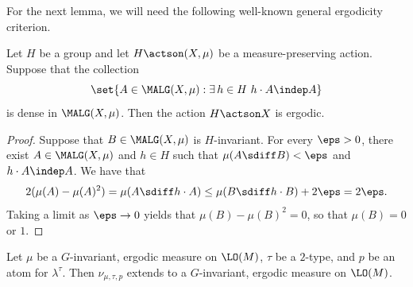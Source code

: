 For the next lemma, we will need the following well-known general ergodicity criterion.
\begin{prop}
\label{p:indep-ergodicity}
Let $H$ be a group and let $H \actson (X, \mu)$ be a measure-preserving action. Suppose that the collection
\begin{equation*}
\set{A \in \MALG(X, \mu) : \exists\, h \in H \ h \cdot A \indep A}
\end{equation*}
is dense in $\MALG(X, \mu)$. Then the action $H \actson X$ is ergodic.
\end{prop}
\begin{proof}
Suppose that $B \in \MALG(X, \mu)$ is $H$-invariant. For every $\eps > 0$, there exist $A \in \MALG(X, \mu)$ and $h \in H$ such that $\mu(A \sdiff B) < \eps$ and $h \cdot A \indep A$. We have that
\begin{equation*}
2(\mu(A) - \mu(A)^2) = \mu(A \sdiff h \cdot A) \leq \mu(B \sdiff h \cdot B) + 2\eps = 2\eps.
\end{equation*}
Taking a limit as $\eps \to 0$ yields that $\mu(B) - \mu(B)^2 = 0$, so that $\mu(B) = 0$ or $1$.
\end{proof}
\begin{lemma}
\label{Lem:measures}
Let $\mu$ be a $G$-invariant, ergodic measure on $\LO(M)$, $\tau$ be a $2$-type, and $p$ be an atom for $\lambda^\tau$. Then $\nu_{\mu, \tau, p}$ extends to a $G$-invariant, ergodic measure on $\LO(M)$.
\end{lemma}
